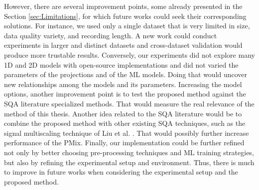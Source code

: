 However, there are several improvement points, some already presented in the Section \ref{sec:Limitations}, for which future works could seek their corresponding solutions. 
For instance, we used only a single dataset that is very limited in size, data quality variety, and recording length. A new work could conduct experiments in larger and distinct datasets and cross-dataset validation would produce more trustable results. 
Conversely, our experiments did not explore many 1D and 2D models with open-source implementations and did not varied the parameters of the projections and of the \gls{ML} models. Doing that would uncover new relationships among the models and its parameters. 
Increasing the model options, another improvement point is to test the proposed method against the SQA literature specialized methods. That would measure the real relevance of the method of this thesis. 
Another idea related to the \gls{SQA} literature would be to combine the proposed method with other existing \gls{SQA} techniques, such as the signal multiscaling technique of Liu et al. \cite{imaging-6}. That would possibly further increase performance of the \gls{PMix}. 
Finally, our implementation could be further refined not only by better choosing pre-processing techniques and \gls{ML} training strategies, but also by refining the experimental setup and environment. 
Thus, there is much to improve in future works when considering the experimental setup and the proposed method.
